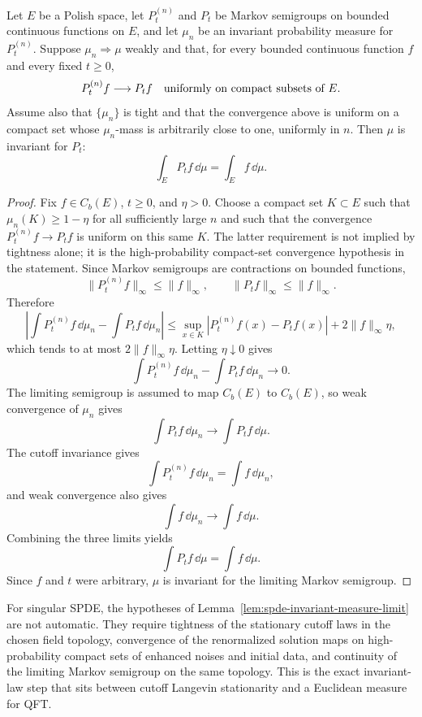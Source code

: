 \begin{lemma}
\label{lem:spde-invariant-measure-limit}
Let \(E\) be a Polish space, let \(P_t^{(n)}\) and \(P_t\) be Markov
semigroups on bounded continuous functions on \(E\), and let
\(\mu_n\) be an invariant probability measure for \(P_t^{(n)}\).  Suppose
\(\mu_n\Rightarrow\mu\) weakly and that, for every bounded continuous
function \(f\) and every fixed \(t\geq0\),
\[
  P_t^{(n)}f\longrightarrow P_tf
  \quad\hbox{uniformly on compact subsets of }E .
\]
Assume also that \(\{\mu_n\}\) is tight and that the convergence above is
uniform on a compact set whose \(\mu_n\)-mass is arbitrarily close to one,
uniformly in \(n\).  Then \(\mu\) is invariant for \(P_t\):
\[
  \int_E P_tf\,\dd\mu=\int_E f\,\dd\mu .
\]
\end{lemma}

\begin{proof}
Fix \(f\in C_b(E)\), \(t\geq0\), and \(\eta>0\).  Choose a compact set
\(K\subset E\) such that \(\mu_n(K)\ge 1-\eta\) for all sufficiently large
\(n\) and such that the convergence \(P_t^{(n)}f\to P_tf\) is uniform on
this same \(K\).  The latter requirement is not implied by tightness alone;
it is the high-probability compact-set convergence hypothesis in the
statement.  Since Markov semigroups are contractions on bounded functions,
\[
  \|P_t^{(n)}f\|_\infty\le \|f\|_\infty,
  \qquad
  \|P_tf\|_\infty\le \|f\|_\infty .
\]
Therefore
\[
  \left|
    \int P_t^{(n)}f\,\dd\mu_n
    -
    \int P_tf\,\dd\mu_n
  \right|
  \leq
  \sup_{x\in K}|P_t^{(n)}f(x)-P_tf(x)|
  +2\|f\|_\infty\eta ,
\]
which tends to at most \(2\|f\|_\infty\eta\).  Letting \(\eta\downarrow0\)
gives
\[
  \int P_t^{(n)}f\,\dd\mu_n
  -
  \int P_tf\,\dd\mu_n
  \longrightarrow0 .
\]
The limiting semigroup is assumed to map \(C_b(E)\) to \(C_b(E)\), so weak
convergence of \(\mu_n\) gives
\[
  \int P_tf\,\dd\mu_n\longrightarrow \int P_tf\,\dd\mu .
\]
The cutoff invariance gives
\[
  \int P_t^{(n)}f\,\dd\mu_n=\int f\,\dd\mu_n,
\]
and weak convergence also gives
\[
  \int f\,\dd\mu_n\longrightarrow \int f\,\dd\mu .
\]
Combining the three limits yields
\[
  \int P_tf\,\dd\mu=\int f\,\dd\mu .
\]
Since \(f\) and \(t\) were arbitrary, \(\mu\) is invariant for the limiting
Markov semigroup.
\end{proof}

For singular SPDE, the hypotheses of
Lemma~\ref{lem:spde-invariant-measure-limit} are not automatic.
They require tightness of the stationary cutoff laws in the chosen field
topology, convergence of the renormalized solution maps on high-probability
compact sets of enhanced noises and initial data, and continuity of the
limiting Markov semigroup on the same topology.  This is the exact
invariant-law step that sits between cutoff Langevin stationarity and a
Euclidean measure for QFT.

